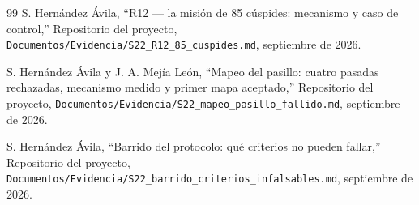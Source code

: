 \documentclass[12pt,letterpaper]{article}
\begin{document}
\begin{thebibliography}{99}
S. Hernández Ávila, ``R12 --- la misión de 85 cúspides: mecanismo y caso de control,'' Repositorio del proyecto, \texttt{Documentos/Evidencia/S22\_R12\_85\_cuspides.md}, septiembre de 2026.

S. Hernández Ávila y J. A. Mejía León, ``Mapeo del pasillo: cuatro pasadas rechazadas, mecanismo medido y primer mapa aceptado,'' Repositorio del proyecto, \texttt{Documentos/Evidencia/S22\_mapeo\_pasillo\_fallido.md}, septiembre de 2026.

S. Hernández Ávila, ``Barrido del protocolo: qué criterios no pueden fallar,'' Repositorio del proyecto, \texttt{Documentos/Evidencia/S22\_barrido\_criterios\_infalsables.md}, septiembre de 2026.

\end{thebibliography}
\end{document}
